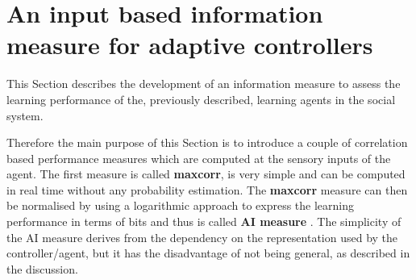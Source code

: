 \section[Introduction: input based measure]{An input based information measure for adaptive controllers \label{Chapter5:Max Corr Input}}

This Section describes the development of an information measure
to assess the learning performance of the, previously described, learning agents
in the social system.

Therefore the main purpose of this Section is to introduce a couple of correlation 
based performance measures which are computed at the sensory inputs of the agent.
The first measure is called \textbf{maxcorr}, is very simple and
can be computed in real time without any probability estimation.
The \textbf{maxcorr} measure can then be normalised by using a logarithmic approach
to express the learning performance in terms of bits and thus is called \textbf{AI measure} .
The simplicity of the AI measure derives from the dependency on the
representation used by the controller/agent, but it has the disadvantage of
not being general, as described in the discussion.

